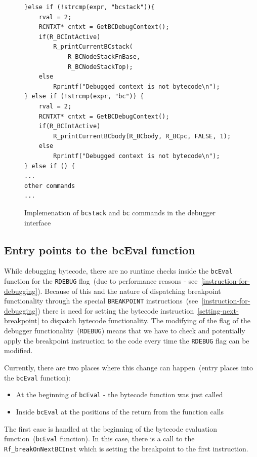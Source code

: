 \documentclass[thesis=M,english]{FITthesis}[2018/10/20]
\newcommand{\code}[1]{\texttt{#1}}
\begin{document}
{\begin{figure}[H]
\begin{lstlisting}
}else if (!strcmp(expr, "bcstack")){
    rval = 2;
    RCNTXT* cntxt = GetBCDebugContext();
    if(R_BCIntActive)
        R_printCurrentBCstack(
            R_BCNodeStackFnBase,
            R_BCNodeStackTop);
    else
        Rprintf("Debugged context is not bytecode\n");
} else if (!strcmp(expr, "bc")) {
    rval = 2;
    RCNTXT* cntxt = GetBCDebugContext();
    if(R_BCIntActive)
        R_printCurrentBCbody(R_BCbody, R_BCpc, FALSE, 1);
    else
        Rprintf("Debugged context is not bytecode\n");
} else if () {
...
other commands
...
\end{lstlisting}
	\caption{Implemenation of \code{bcstack} and \code{bc} commands in the debugger interface}\label{fig:implementation-of-bcstack-bc-commands}
\end{figure}

\subsection{Entry points to the bcEval function}

While debugging bytecode, there are no runtime checks inside the \code{bcEval} function for the \code{RDEBUG} flag~(due to performance reasons - see~\ref{instruction-for-debugging}). Because of this and the nature of dispatching breakpoint functionality through the special \code{BREAKPOINT} instructions~(see~\ref{instruction-for-debugging}) there is need for setting the bytecode instruction~\ref{setting-next-breakpoint} to dispatch bytecode functionality. The modifying of the flag of the debugger functionality~(\code{RDEBUG}) means that we have to check and potentially apply the breakpoint instruction to the code every time the \code{RDEBUG} flag can be modified.

Currently, there are two places where this change can happen~(entry places into the \code{bcEval} function):

\begin{itemize}
	\item At the beginning of \code{bcEval} - the bytecode function was just called
	\item Inside \code{bcEval} at the positions of the return from the function calls
\end{itemize}

The first case is handled at the beginning of the bytecode evaluation function~(\code{bcEval} function). In this case, there is a call to the \code{Rf{\_}breakOnNextBCInst} which is setting the breakpoint to the first instruction.

}
\end{document}
